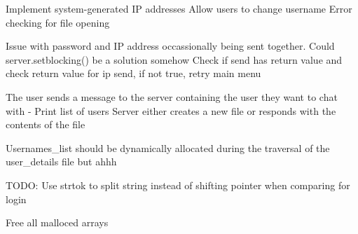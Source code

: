 Implement system-generated IP addresses
Allow users to change username
Error checking for file opening

Issue with password and IP address occassionally being sent together. 
    Could server.setblocking() be a solution somehow
    Check if send has return value and check return value for ip send, if not true, retry main menu

The user sends a message to the server containing the user they want to chat with
 - Print list of users 
Server either creates a new file or responds with the contents of the file    

Usernames_list should be dynamically allocated during the traversal of the user_details file but ahhh

TODO: Use strtok to split string instead of shifting pointer when comparing for login

Free all malloced arrays